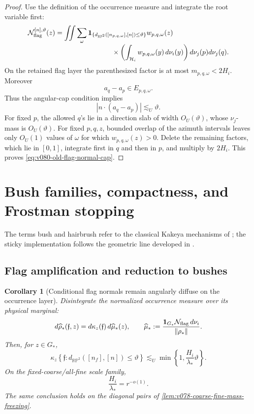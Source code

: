 \documentclass[10pt]{article}
\newtheorem{corollary}[theorem]{Corollary}
\begin{document}
\begin{proof}
Use the definition of the occurrence measure and integrate the root variable first:
\[
\begin{aligned}
\mathcal N_{\rm flag}^{[n],\vartheta}(z)
&=
\iint\sum_\omega
\mathbf 1_{\{d_{\mathbb {RP}^2}([n_{p,q,\omega}],[n])\le\vartheta\}}
w_{p,q,\omega}(z)
\\[-1mm]
&\hspace{29mm}\times
\left(
\int_{\mathcal H_i}w_{p,q,\omega}(y)\,d\nu_i(y)
\right)
d\nu_j(p)d\nu_j(q).
\end{aligned}
\]
On the retained flag layer the parenthesized factor is at most
\(m_{p,q,\omega}<2H_i\).  Moreover
\[
a_q-a_p\in E_{p,q,\omega}.
\]
Thus the angular-cap condition implies
\[
|n\cdot(a_q-a_p)|
\lesssim_U
\vartheta.
\]
For fixed \(p\), the allowed \(q\)'s lie in a direction slab of width
\(O_U(\vartheta)\), whose \(\nu_j\)-mass is \(O_U(\vartheta)\).  For fixed \(p,q,z\), bounded
overlap of the azimuth intervals leaves only \(O_U(1)\) values of \(\omega\) for which
\(w_{p,q,\omega}(z)>0\).  Delete the remaining factors, which lie in \([0,1]\), integrate first
in \(q\) and then in \(p\), and multiply by \(2H_i\).  This proves
\eqref{eq:v080-old-flag-normal-cap}.
\end{proof}

\clearpage
\section{Bush families, compactness, and Frostman stopping}
The terms bush and hairbrush refer to the classical Kakeya mechanisms of
\cite{Bourgain1991,Wolff1995}; the sticky implementation follows the geometric line developed in
\cite{KatzLabaTao2000,WangZahlSticky}.


\subsection{Flag amplification and reduction to bushes}

\begin{corollary}[Conditional flag normals remain angularly diffuse on the occurrence layer]
\label{cor:v080-conditional-flag-normal-cap}
Disintegrate the normalized occurrence measure over its physical marginal:
\[
d\widehat\rho_*(\mathfrak f,z)
=
d\kappa_z(\mathfrak f)\,d\widehat\mu_*(z),
\qquad
\widehat\mu_*
:=
\frac{\mathbf 1_{G_*}\mathcal N_{\rm flag}\,d\nu_i}
{\|\rho_*\|}.
\]
Then, for \(z\in G_*\),
\begin{equation}
\label{eq:v080-conditional-normal-cap}
\boxed{
\kappa_z
\left\{
\mathfrak f:
d_{\mathbb {RP}^2}([n_f],[n])\le\vartheta
\right\}
\lesssim_U
\min\left\{1,\frac{H_i}{\lambda_*}\vartheta\right\}.
}
\end{equation}
On the fixed-coarse/all-fine scale family,
\begin{equation}
\label{eq:v080-coarse-angular-tax-subpower}
\boxed{
\frac{H_i}{\lambda_*}
=
r^{-o(1)}.
}
\end{equation}
The same conclusion holds on the diagonal pairs of
\cref{lem:v078-coarse-fine-mass-freezing}.
\end{corollary}
\end{document}
